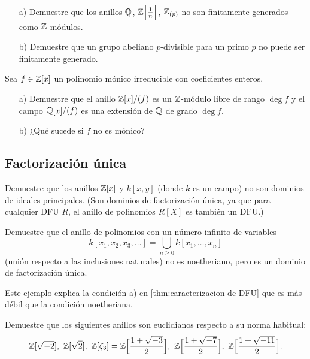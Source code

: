 \begin{ejercicio}
  \begin{enumerate}
  \item[a)] Demuestre que los anillos $\mathbb{Q}$, $\mathbb{Z} \Bigl[\frac{1}{n}\Bigr]$,
    $\mathbb{Z}_{(p)}$ no son finitamente generados como $\mathbb{Z}$-módulos.

  \item[b)] Demuestre que un grupo abeliano $p$-divisible para un primo $p$ no
    puede ser finitamente generado.
  \end{enumerate}
\end{ejercicio}

\begin{ejercicio}
  Sea $f \in \mathbb{Z} [x]$ un polinomio mónico irreducible con coeficientes enteros.

  \begin{enumerate}
    \item[a)] Demuestre que el anillo $\mathbb{Z} [x] / (f)$ es un $\mathbb{Z}$-módulo libre
      de rango $\deg f$ y el campo $\mathbb{Q} [x] / (f)$ es una extensión de $\mathbb{Q}$ de
      grado $\deg f$.

    \item[b)] ¿Qué sucede si $f$ no es mónico?
  \end{enumerate}
\end{ejercicio}

\subsection*{Factorización única}

\begin{ejercicio}
  Demuestre que los anillos $\mathbb{Z} [x]$ y $k [x,y]$ (donde $k$ es un campo) no son
  dominios de ideales principales. (Son dominios de factorización única, ya que
  para cualquier DFU $R$, el anillo de polinomios $R[X]$ es también un DFU.)
\end{ejercicio}

\begin{ejercicio}
  Demuestre que el anillo de polinomios con un número infinito de variables
  $$k [x_1,x_2,x_3,\ldots] = \bigcup_{n\ge 0} k [x_1,\ldots,x_n]$$
  (unión respecto a las inclusiones naturales) no es noetheriano, pero es un
  dominio de factorización única.

  Este ejemplo explica la condición a) en \ref{thm:caracterizacion-de-DFU} que
  es más débil que la condición noetheriana.
\end{ejercicio}

\begin{ejercicio}
  Demuestre que los siguientes anillos son euclidianos respecto a su norma
  habitual:
  \[ \mathbb{Z} [\sqrt{-2}], ~ \mathbb{Z} [\sqrt{2}], ~
     \mathbb{Z} [\zeta_3] = \mathbb{Z} \Bigl[\frac{1+\sqrt{-3}}{2}\Bigr], ~
     \mathbb{Z} \Bigl[\frac{1+\sqrt{-7}}{2}\Bigr], ~
     \mathbb{Z} \Bigl[\frac{1+\sqrt{-11}}{2}\Bigr]. \]
\end{ejercicio}

